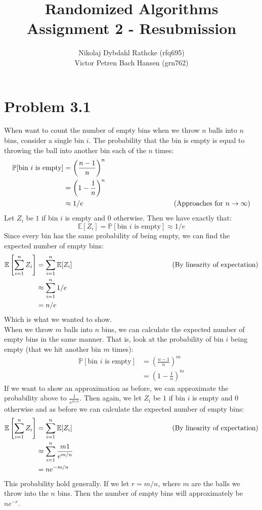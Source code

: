 \documentclass[a4paper]{article}
\author{Nikolaj Dybdahl Rathcke (rfq695) \\ Victor Petren Bach Hansen (grn762)}
\title{Randomized Algorithms \\ Assignment 2 - Resubmission}
\newcommand{\comment}[1]{%
  \text{\phantom{(#1)}} \tag{#1}}
\begin{document}
\maketitle

\section*{Problem 3.1}
When want to count the number of empty bins when we throw $n$ balls into $n$ bins, consider a single bin $i$. The probability that the bin is empty is equal to throwing the ball into another bin each of the $n$ times:
\begin{align*}
  \mathbb{P}[\mbox{bin $i$ is empty}] &= \left(\frac{n-1}{n}\right)^n \\
                                      &= \left(1-\frac{1}{n}\right)^n \\
                                      &\approx 1/e \comment{Approaches for $n\rightarrow \infty$}
\end{align*}
Let $Z_i$ be $1$ if bin $i$ is empty and $0$ otherwise. Then we have exactly that:
$$
\mathbb{E}[Z_i]=\mathbb{P}[\mbox{bin $i$ is empty}]\approx 1/e
$$
Since every bin has the same probability of being empty, we can find the expected number of empty bins:
\begin{align*}
  \mathbb{E}\left[\sum_{i=1}^n Z_i\right] &= \sum_{i=1}^n \mathbb{E}[Z_i] \comment{By linearity of expectation} \\
                                          &\approx \sum_{i=1}^n 1/e \\
                                          &=n/e
\end{align*}
Which is what we wanted to show. \\
When we throw $m$ balls into $n$ bins, we can calculate the expected number of empty bins in the same manner. That is, look at the probability of bin $i$ being empty (that we hit another bin $m$ times):
\begin{align*}
  \mathbb{P}[\mbox{bin $i$ is empty}] &= \left(\frac{n-1}{n}\right)^m \\
                                      &= \left(1-\frac{1}{n}\right)^m
\end{align*}
If we want to show an approximation as before, we can approximate the probability above to $\frac{1}{e^{m/n}}$. Then again, we let $Z_i$ be $1$ if bin $i$ is empty and $0$ otherwise and as before we can calculate the expected number of empty bins:
\begin{align*}
  \mathbb{E}\left[\sum_{i=1}^n Z_i\right] &= \sum_{i=1}^n \mathbb{E}[Z_i] \comment{By linearity of expectation} \\
                                          &\approx \sum_{i=1}^n \frac{m1}{e^{m/n}} \\
                                          &=ne^{-m/n}
\end{align*}
This probability hold generally. If we let $r=m/n$, where $m$ are the balls we throw into the $n$ bins. Then the number of empty bins will approximately be $ne^{-r}$.
\end{document}
